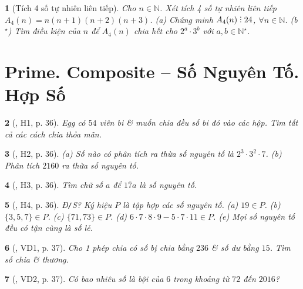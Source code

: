 \documentclass{article}
\newtheorem{baitoan}{}
\DeclareRobustCommand{\divby}{%
	\mathrel{\vbox{\baselineskip.65ex\lineskiplimit0pt\hbox{.}\hbox{.}\hbox{.}}}%
}
\begin{document}
\begin{baitoan}[Tích 4 số tự nhiên liên tiếp]
	Cho $n\in\mathbb{N}$. Xét tích 4 số tự nhiên liên tiếp $A_4(n) = n(n + 1)(n + 2)(n + 3)$. (a) Chứng minh $A_4(n)\divby24$, $\forall n\in\mathbb{N}$. (b${}^\star$) Tìm điều kiện của $n$ để $A_4(n)$ chia hết cho $2^a\cdot3^b$ với $a,b\in\mathbb{N}^\star$.
\end{baitoan}


\section{Prime. Composite -- Số Nguyên Tố. Hợp Số}

\begin{baitoan}[\cite{Binh_boi_duong_Toan_6_tap_1}, H1, p. 36]
	Egg có $54$ viên bi \& muốn chia đều số bi đó vào các hộp. Tìm tất cả các cách chia thỏa mãn.
\end{baitoan}

\begin{baitoan}[\cite{Binh_boi_duong_Toan_6_tap_1}, H2, p. 36]
	(a) Số nào có phân tích ra thừa số nguyên tố là $2^3\cdot3^2\cdot7$. (b) Phân tích $2160$ ra thừa số nguyên tố.
\end{baitoan}

\begin{baitoan}[\cite{Binh_boi_duong_Toan_6_tap_1}, H3, p. 36]
	Tìm chữ số $a$ để $\overline{17a}$ là số nguyên tố.
\end{baitoan}

\begin{baitoan}[\cite{Binh_boi_duong_Toan_6_tap_1}, H4, p. 36]
	{\rm Đ{\tt/}S?} Ký hiệu $P$ là tập hợp các số nguyên tố. (a) $19\in P$. (b) $\{3,5,7\}\in P$. (c) $\{71,73\}\in P$. (d) $6\cdot7\cdot8\cdot9 - 5\cdot7\cdot11\in P$. (e) Mọi số nguyên tố đều có tận cùng là số lẻ.
\end{baitoan}

\begin{baitoan}[\cite{Binh_boi_duong_Toan_6_tap_1}, VD1, p. 37]
	Cho 1 phép chia có số bị chia bằng $236$ \& số dư bằng $15$. Tìm số chia \& thương.
\end{baitoan}

\begin{baitoan}[\cite{Binh_boi_duong_Toan_6_tap_1}, VD2, p. 37]
	Có bao nhiêu số là bội của $6$ trong khoảng từ $72$ đến $2016$?
\end{baitoan}
\end{document}
